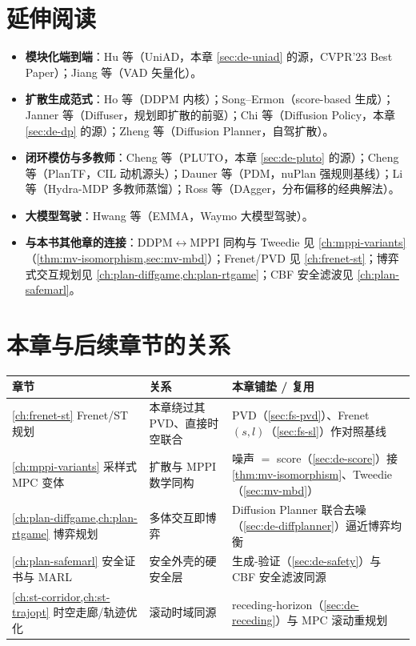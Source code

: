 \section*{延伸阅读}
\begin{itemize}
  \item \textbf{模块化端到端}：Hu 等\cite{hu2023uniad}（UniAD，本章 \cref{sec:de-uniad} 的源，CVPR'23 Best Paper）；Jiang 等\cite{jiang2023vad}（VAD 矢量化）。
  \item \textbf{扩散生成范式}：Ho 等\cite{ho2020ddpm}（DDPM 内核）；Song--Ermon\cite{song2019score}（score-based 生成）；Janner 等\cite{janner2022diffuser}（Diffuser，规划即扩散的前驱）；Chi 等\cite{chi2023diffusion}（Diffusion Policy，本章 \cref{sec:de-dp} 的源）；Zheng 等\cite{zheng2025diffplanner}（Diffusion Planner，自驾扩散）。
  \item \textbf{闭环模仿与多教师}：Cheng 等\cite{cheng2024pluto}（PLUTO，本章 \cref{sec:de-pluto} 的源）；Cheng 等\cite{cheng2023plantf}（PlanTF，CIL 动机源头）；Dauner 等\cite{dauner2023pdm}（PDM，nuPlan 强规则基线）；Li 等\cite{li2024hydramdp}（Hydra-MDP 多教师蒸馏）；Ross 等\cite{ross2011dagger}（DAgger，分布偏移的经典解法）。
  \item \textbf{大模型驾驶}：Hwang 等\cite{hwang2024emma}（EMMA，Waymo 大模型驾驶）。
  \item \textbf{与本书其他章的连接}：DDPM$\leftrightarrow$MPPI 同构与 Tweedie 见 \cref{ch:mppi-variants}（\cref{thm:mv-isomorphism,sec:mv-mbd}）；Frenet/PVD 见 \cref{ch:frenet-st}；博弈式交互规划见 \cref{ch:plan-diffgame,ch:plan-rtgame}；CBF 安全滤波见 \cref{ch:plan-safemarl}。
\end{itemize}

\section*{本章与后续章节的关系}
\begin{table}[H]\centering\small
\begin{tabular}{lll}
\toprule
章节 & 关系 & 本章铺垫 / 复用 \\
\midrule
\cref{ch:frenet-st} Frenet/ST 规划 & 本章绕过其 PVD、直接时空联合 & PVD（\cref{sec:fs-pvd}）、Frenet $(s,l)$（\cref{sec:fs-sl}）作对照基线 \\
\cref{ch:mppi-variants} 采样式 MPC 变体 & 扩散与 MPPI 数学同构 & 噪声 $=$ score（\cref{sec:de-score}）接 \cref{thm:mv-isomorphism}、Tweedie（\cref{sec:mv-mbd}）\\
\cref{ch:plan-diffgame,ch:plan-rtgame} 博弈规划 & 多体交互即博弈 & Diffusion Planner 联合去噪（\cref{sec:de-diffplanner}）逼近博弈均衡 \\
\cref{ch:plan-safemarl} 安全证书与 MARL & 安全外壳的硬安全层 & 生成-验证（\cref{sec:de-safety}）与 CBF 安全滤波同源 \\
\cref{ch:st-corridor,ch:st-trajopt} 时空走廊/轨迹优化 & 滚动时域同源 & receding-horizon（\cref{sec:de-receding}）与 MPC 滚动重规划 \\
\bottomrule
\end{tabular}
\end{table}

